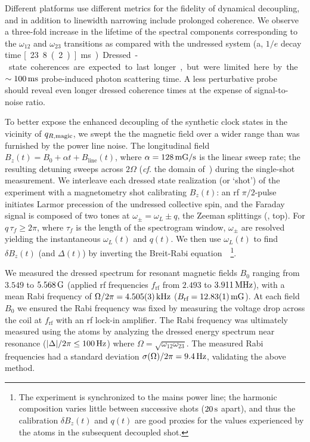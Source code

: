 \documentclass[aps,prl,reprint,superscriptaddress,floatfix]{revtex4-1}
\begin{document}
Different platforms use different metrics for the fidelity of dynamical decoupling, and in addition to linewidth narrowing include prolonged coherence.
We observe a three-fold increase in the lifetime of the spectral components corresponding to the $\omega_{12}$ and $\omega_{23}$ transitions as compared with the undressed system (a, $1/e$ decay time \unit[23.8(2)]{ms}).
Dressed-state coherences are expected to last longer, but were limited here by the $\sim\unit[100]{ms}$ probe-induced photon scattering time.
A less perturbative probe~\cite{jasperse_magic-wavelength_2017} should reveal even longer dressed coherence times at the expense of signal-to-noise ratio. 

To better expose the enhanced decoupling of the synthetic clock states in the vicinity of $q_{R,\text{magic}}$, we swept the the magnetic field over a wider range than was furnished by the power line noise.
The longitudinal field $B_z(t) = B_0 + \alpha t + B_{\text{line}}(t)$, where $\alpha = \unit[128]{mG/s}$ is the linear sweep rate; the resulting detuning sweeps across $2\Omega$ (\textit{cf.} the domain of~) during the single-shot measurement.
We interleave each dressed state realization (or `shot') of the experiment with a magnetometry shot calibrating $B_z(t)$: an rf $\pi/2$-pulse initiates Larmor precession of the undressed collective spin, and the Faraday signal is composed of two tones at $\omega_\pm = \omega_L \pm q$, the Zeeman splittings (, top).
For $q \, \tau_f \geq 2\pi$, where $\tau_f$ is the length of the spectrogram window, $\omega_\pm$ are resolved yielding the instantaneous $\omega_L(t)$ and $q(t)$.
We then use $\omega_L(t)$ to find $\delta B_z(t)$ (and $\Delta(t)$) by inverting the Breit-Rabi equation~\cite{ramsey_molecular_1956}~\footnote{
    The experiment is synchronized to the mains power line; the harmonic composition varies little between successive shots ($\unit[20]{s}$ apart), and thus the calibration $\delta B_z(t)$ and $q(t)$ are good proxies for the values experienced by the atoms in the subsequent decoupled shot.
}.

We measured the dressed spectrum for resonant magnetic fields $B_0$ ranging from $3.549$ to $\unit[5.568]{G}$ (applied rf frequencies $f_{\text{rf}}$ from $2.493$ to $\unit[3.911]{MHz}$), with a mean Rabi frequency of $\Omega/2\pi = \unit[4.505(3)]{kHz}$ ($B_{\text{rf}} = \unit[12.83(1)]{mG}$).
At each field $B_0$ we ensured the Rabi frequency was fixed by measuring the voltage drop across the coil at $f_{\text{rf}}$ with an rf lock-in amplifier.
The Rabi frequency was ultimately measured using the atoms by analyzing the dressed energy spectrum near resonance ($\abs{\Delta}/2\pi \leq \unit[100]{Hz}$) where $\Omega = \sqrt{\omega_{12} \omega_{23}}$.
The measured Rabi frequencies had a standard deviation $\sigma(\Omega)/2\pi = \unit[9.4]{Hz}$, validating the above method.
\end{document}
